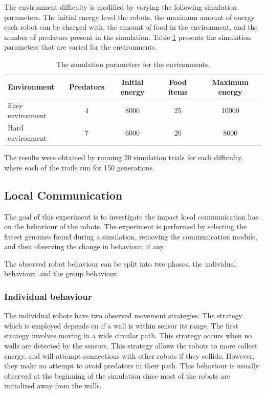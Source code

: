 The environment difficulty is modified by varying the following simulation parameters.
The initial energy level the robots, the maximum amount of energy each robot can be charged with, the amount of food in the environment, and the number of predators present in the simulation.
Table \ref{tab:environment-difficulty} presents the simulation parameters that are varied for the environments.

\begin{table}[H]
	\centering
	
	\begin{tabular}{@{} l c c c c @{}}
		\toprule 
		Environment & \small{Predators} & \small{Initial energy} & \small{Food items} & \small{Maximum energy} \\ 
		\midrule 
		\small{Easy environment} & 4 & 8000 & 25 & 10000 \\ 
		\small{Hard environment} & 7 & 6000 & 20 &8000 \\ 
		\bottomrule 
		
	\end{tabular} 
	\caption{The simulation parameters for the environments.}
	\label{tab:environment-difficulty}
\end{table}

The results were obtained by running 20 simulation trials for each difficulty, where each of the trails run for 150 generations.

\newpage
\pagestyle{plain}



\newpage
\pagestyle{main}

\subsection{Local Communication}
\label{sec:local_communication}
The goal of this experiment is to investigate the impact local communication has on the behaviour of the robots.
The experiment is performed by selecting the fittest genomes found during a simulation, removing the communication module, and then observing the change in behaviour, if any.

The observed robot behaviour can be split into two phases, the individual behaviour, and the group behaviour.

\subsubsection{Individual behaviour}
\label{sec:invdividual_behaviour}
The individual robots have two observed movement strategies.
The strategy which is employed depends on if a wall is within sensor its range.
The first strategy involves moving in a wide circular path.
This strategy occurs when no walls are detected by the sensors.
This strategy allows the robots to more collect energy, and will attempt connections with other robots if they collide.
However, they make no attempt to avoid predators in their path.
This behaviour is usually observed at the beginning of the simulation since most of the robots are initialized away from the walls.

